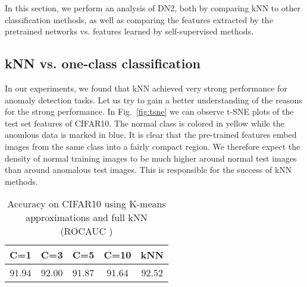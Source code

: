 \documentclass{article}
\begin{document}
In this section, we perform an analysis of DN2, both by comparing kNN to other classification methods, as well as comparing the features extracted by the pretrained networks vs. features learned by self-supervised methods. 

\subsection{kNN vs. one-class classification}
\label{subsec:analysis:knn}

In our experiments, we found that kNN achieved very strong performance for anomaly detection tasks. Let us try to gain a better understanding of the reasons for the strong performance. In Fig.~\ref{fig:tsne} we can observe t-SNE plots of the test set features of CIFAR10. The normal class is colored in yellow while the anomlous data is marked in blue. It is clear that the pre-trained features embed images from the same class into a fairly compact region. We therefore expect the density of normal training images to be much higher around normal test images than around anomalous test images. This is responsible for the success of kNN methods.

\begin{table}
  \centering
  \caption{Accuracy on CIFAR10 using K-means approximations and full kNN (ROCAUC )}
  \label{tab:exp_kmeans}

    \begin{tabular}{ccccc}
     \toprule      

      C=1 & C=3 & C=5 & C=10 & kNN \\
      \midrule
      91.94& 92.00& 91.87& 91.64& 92.52 \\
      \bottomrule

    \end{tabular}
\end{table}
\end{document}
